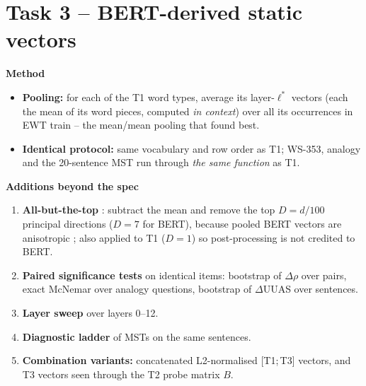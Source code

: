 \documentclass[11pt,a4paper]{article}
\newcommand{\lstar}{\ensuremath{\ell^*}}
\newcommand{\blk}[1]{\par\needspace{5\baselineskip}\smallskip\noindent\textbf{#1}\par\nobreak\vspace{1pt}}
\begin{document}
\section{Task 3 -- BERT-derived static vectors}\label{sec:t3}
\blk{Method}
\begin{itemize}
\item \textbf{Pooling:} for each of the \VocabTypes{} T1 word types, average its layer-\lstar{} vectors (each the mean of its word pieces,
computed \emph{in context}) over all its occurrences in EWT train -- the mean/mean pooling that \citet{bommasani} found best.
\item \textbf{Identical protocol:} same vocabulary and row order as T1; WS-353, analogy and the 20-sentence MST run through \emph{the same
function} as T1.
\end{itemize}
\blk{Additions beyond the spec}
\begin{enumerate}[label=(\alph*)]
\item \textbf{All-but-the-top} \citep{mu}: subtract the mean and remove the top $D=d/100$ principal directions ($D=7$ for BERT), because
pooled BERT vectors are anisotropic \citep{ethayarajh}; also applied to T1 ($D=1$) so post-processing is not credited to BERT.
\item \textbf{Paired significance tests} on identical items: bootstrap of $\Delta\rho$ over pairs, exact McNemar over analogy
questions, bootstrap of $\Delta$UUAS over sentences.
\item \textbf{Layer sweep} over layers 0--12.
\item \textbf{Diagnostic ladder} of MSTs on the same sentences.
\item \textbf{Combination variants:} concatenated L2-normalised [T1;\,T3] vectors, and T3 vectors seen through the T2 probe matrix $B$.
\end{enumerate}

\begin{table}[t]\centering\footnotesize\setlength{\tabcolsep}{3.6pt}\resizebox{\textwidth}{!}{}
\caption{Task 3 vs.\ Task 1 (identical items), with the Task 2 probe as a reference on the same 20 sentences and pool.}
\label{tab:t3}\end{table}
\begin{table}[t]\centering\footnotesize\setlength{\tabcolsep}{4pt}
\caption{Paired tests on identical items. Analogy: number of questions solved by only A / only B, exact McNemar $p$.}
\label{tab:tests}\end{table}
\end{document}
